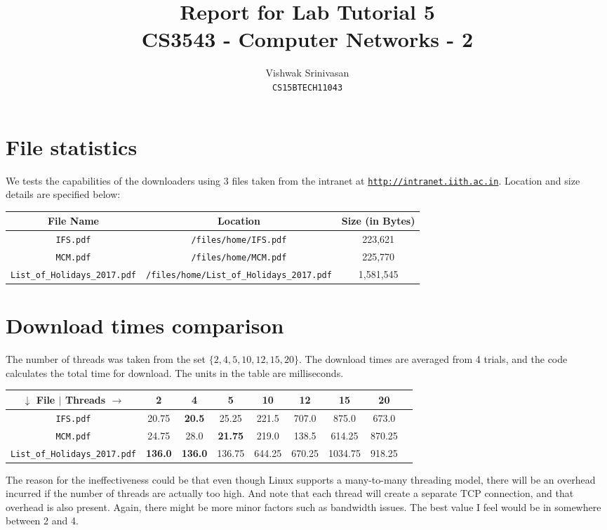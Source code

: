 \documentclass{article}
\title{Report for Lab Tutorial 5\\
CS3543 - Computer Networks - 2}
\author{Vishwak Srinivasan\\
\texttt{CS15BTECH11043}}
\date{}
\begin{document}
\maketitle

\section*{File statistics}
\begin{flushleft}
We tests the capabilities of the downloaders using 3 files taken from the intranet at \texttt{\url{http://intranet.iith.ac.in}}. Location and size details are specified below:
\begin{center}
\begin{tabular}{|c|c|c|}
\hline
File Name & Location & Size (in Bytes)\\
\hline
\hline
\texttt{IFS.pdf} & \texttt{/files/home/IFS.pdf} & 223,621 \\
\hline
\texttt{MCM.pdf} & \texttt{/files/home/MCM.pdf} & 225,770 \\
\hline
\texttt{List\_of\_Holidays\_2017.pdf} & \texttt{/files/home/List\_of\_Holidays\_2017.pdf} & 1,581,545 \\
\hline
\end{tabular}
\end{center}
\end{flushleft}

\section*{Download times comparison}
\begin{flushleft}
The number of threads was taken from the set \(\{2, 4, 5, 10, 12, 15, 20\}\). The download times are averaged from 4 trials, and the code calculates the total time for download. The units in the table are milliseconds.
\begin{center}
\begin{tabular}{|c|c|c|c|c|c|c|c|c|}
\hline
\(\downarrow\) File \(\vert\) Threads \(\rightarrow\) & 2 & 4 & 5 & 10 & 12 & 15 & 20 \\
\hline
\hline
\texttt{IFS.pdf} & 20.75 & \textbf{20.5} & 25.25 & 221.5 & 707.0 & 875.0 & 673.0 \\
\hline
\texttt{MCM.pdf} & 24.75 & 28.0 & \textbf{21.75} & 219.0 & 138.5 & 614.25 & 870.25 \\
\hline
\texttt{List\_of\_Holidays\_2017.pdf} & \textbf{136.0} & \textbf{136.0} & 136.75 & 644.25 & 670.25 & 1034.75 & 918.25 \\
\hline 
\end{tabular}
\end{center}

The reason for the ineffectiveness could be that even though Linux supports a many-to-many threading model, there will be an overhead incurred if the number of threads are actually too high. And note that each thread will create a separate TCP connection, and that overhead is also present. Again, there might be more minor factors such as bandwidth issues. The best value I feel would be in somewhere between 2 and 4.
\end{flushleft}
\end{document}
